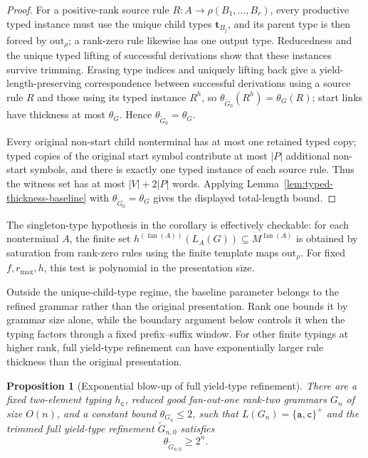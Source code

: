 \documentclass[11pt]{article}
\numberwithin{equation}{section}
\theoremstyle{plain}
\newtheorem{proposition}[theorem]{Proposition}
\theoremstyle{definition}
\theoremstyle{remark}
\newcommand{\out}{\mathrm{out}}
\newcommand{\fan}{\operatorname{fan}}
\begin{document}
\begin{proof}
For a positive-rank source rule
$R:A\to\rho(B_1,\ldots,B_r)$, every productive typed instance must use the
unique child types $\mathbf t_{B_j}$, and its parent type is then forced by
$\out_\rho$; a rank-zero rule likewise has one output type.  Reducedness and
the unique typed lifting of successful derivations show that these instances
survive trimming.  Erasing type indices and uniquely lifting back give a
yield-length-preserving correspondence between successful derivations using a
source rule $R$ and those using its typed instance $R^h$, so
$\theta_{\widetilde G_0}(R^h)=\theta_G(R)$; start links have thickness at most
$\theta_G$.  Hence $\theta_{\widetilde G_0}=\theta_G$.

Every original non-start child nonterminal has at most one retained typed copy;
typed copies of the original start symbol contribute at most $|P|$ additional
non-start symbols, and there is exactly one typed instance of each source rule.
Thus the witness set has at most $|V|+2|P|$ words.  Applying
Lemma~\ref{lem:typed-thickness-baseline} with
$\theta_{\widetilde G_0}=\theta_G$ gives the displayed total-length bound.
\end{proof}

The singleton-type hypothesis in the corollary is effectively checkable:
for each nonterminal $A$, the finite set
$h^{(\fan(A))}(L_A(G))\subseteq M^{\fan(A)}$ is obtained by saturation from
rank-zero rules using the finite template maps $\out_\rho$.  For fixed
$f,r_{\max},h$, this test is polynomial in the presentation size.

Outside the unique-child-type regime, the baseline parameter belongs to the
refined grammar rather than the original presentation.  Rank one bounds it by
grammar size alone, while the boundary argument below controls it when the
typing factors through a fixed prefix--suffix window.  For other finite typings
at higher rank, full yield-type refinement can have exponentially larger rule
thickness than the original presentation.

\begin{proposition}[Exponential blow-up of full yield-type refinement]
\label{prop:typed-thickness-exponential}
There are a fixed two-element typing $h_{\mathtt c}$, reduced good fan-out-one rank-two
grammars $G_n$ of size $O(n)$, and a constant bound
$\theta_{G_n}\le2$, such that $L(G_n)=\{\mathtt a,\mathtt c\}^+$ and the
trimmed full yield-type refinement $\widetilde G_{n,0}$ satisfies
\[
  \theta_{\widetilde G_{n,0}}\ge 2^n.
\]
\end{proposition}
\end{document}
